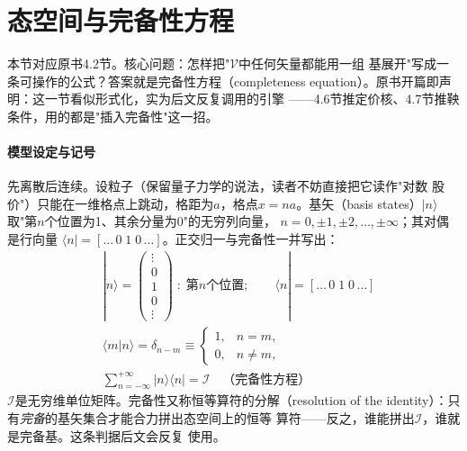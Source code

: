 \section{态空间与完备性方程}

本节对应原书4.2节。核心问题：怎样把"$\mathcal{V}$中任何矢量都能用一组
基展开"写成一条可操作的公式？答案就是完备性方程（completeness
equation）。原书开篇即声明：这一节看似形式化，实为后文反复调用的引擎
——4.6节推定价核、4.7节推鞅条件，用的都是"插入完备性"这一招。

\paragraph{模型设定与记号}
先离散后连续。设粒子（保留量子力学的说法，读者不妨直接把它读作"对数
股价"）只能在一维格点上跳动，格距为$a$，格点$x=na$。基矢（basis
states）$|n\rangle$取"第$n$个位置为1、其余分量为0"的无穷列向量，
$n=0,\pm1,\pm2,\ldots,\pm\infty$；其对偶是行向量
$\langle n|=[\ldots\,0\;1\;0\,\ldots]$。正交归一与完备性一并写出：
\begin{align*}
&|n\rangle=
\begin{pmatrix}
\vdots\\
0\\
1\\
0\\
\vdots
\end{pmatrix}
\;:\;\text{第$n$个位置};\qquad
\langle n|=[\ldots\,0\;1\;0\,\ldots]\\
&\langle m|n\rangle=\delta_{n-m}\equiv
\begin{cases}
1, & n=m,\\
0, & n\neq m,
\end{cases}\\
&\sum_{n=-\infty}^{+\infty}|n\rangle\langle n|=\mathcal{I}
\quad\text{（完备性方程）}
\end{align*}
$\mathcal{I}$是无穷维单位矩阵。完备性又称恒等算符的分解（resolution of
the identity）：只有\emph{完备}的基矢集合才能合力拼出态空间上的恒等
算符——反之，谁能拼出$\mathcal{I}$，谁就是完备基。这条判据后文会反复
使用。


